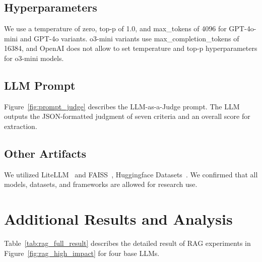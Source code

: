 \subsection{Hyperparameters}
We use a temperature of zero, top-p of 1.0, and max\_tokens of 4096 for GPT-4o-mini and GPT-4o variants. o3-mini variants use max\_completion\_tokens of 16384, and OpenAI does not allow to set temperature and top-p hyperparameters for o3-mini models.

\subsection{LLM Prompt}
\label{subsec:appendix_llm_judge}
Figure~\ref{fig:prompt_judge} describes the LLM-as-a-Judge prompt. The LLM outputs the JSON-formatted judgment of seven criteria and an overall score for extraction.

\subsection{Other Artifacts}
We utilized LiteLLM~\cite{litellm} and FAISS~\cite{douze2024faiss}, Huggingface Datasets~\cite{lhoest-etal-2021-datasets}.
We confirmed that all models, datasets, and frameworks are allowed for research use. 



\vspace{2em}
\section{Additional Results and Analysis}
\label{sec:appendix_results}

Table~\ref{tab:rag_full_result} describes the detailed result of RAG experiments in Figure~\ref{fig:rag_high_impact} for four base LLMs. 


